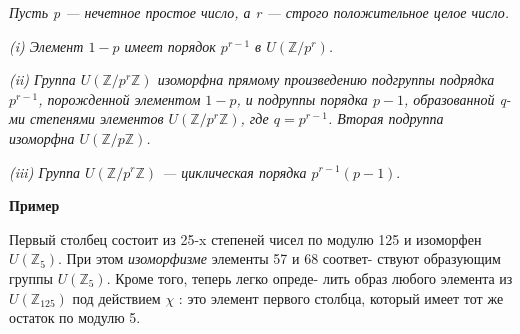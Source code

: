 \documentclass{../template/mai_book}
\begin{document}
\vspace{\baselineskip}
\begin{thm}
\slshape{Пусть p --- нечетное простое число, а r --- строго положительное \linebreak целое число.} \par \slshape{(\textit{i}) Элемент $1-p$ имеет порядок $p^{r-1}$ в $U(\mathbb{Z}/p^{r})$.} \par 
\slshape{(\textit{ii}) Группа $U(\mathbb{Z}/p^{r}\mathbb{Z})$ изоморфна прямому произведению подгруппы \linebreak подрядка $p^{r-1}$, порожденной элементом $1-p$, и подруппы порядка $p-1$, \linebreak образованной q-ми степенями элементов  $U(\mathbb{Z}/p^{r}\mathbb{Z})$, где $q=p^{r-1}$. Вторая подруппа изоморфна  $U(\mathbb{Z}/p\mathbb{Z})$}. \par 
\slshape{(\textit{iii}) Группа $U(\mathbb{Z}/p^{r}\mathbb{Z})$ --- циклическая порядка $p^{r-1}(p-1).$}
\end{thm}
\noindent \textbf{Пример} \par
{} \par
Первый столбец состоит из 25-x степеней чисел по модулю 125 и \linebreak изоморфен $U(\mathbb{Z}_{5})$. При этом \textit{изоморфизме} элементы 57 и 68 соответ- \linebreak ствуют образующим группы $U({\mathbb{Z}_{5}})$. Кроме того, теперь легко опреде- \linebreak лить образ любого элемента из $U(\mathbb{Z}_{125})$ под действием $\chi$ : это элемент \linebreak первого столбца, который имеет тот же остаток по модулю 5. \par

\newpage
\end{document}
